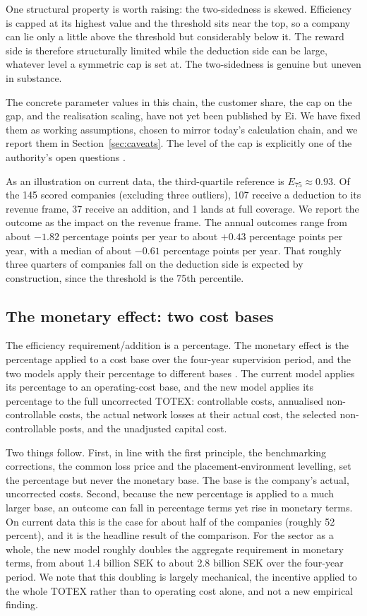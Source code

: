 One structural property is worth raising: the two-sidedness is skewed. Efficiency is capped at its
highest value and the threshold sits near the top, so a company can lie only a little above the
threshold but considerably below it. The reward side is therefore structurally limited while the
deduction side can be large, whatever level a symmetric cap is set at. The two-sidedness is genuine
but uneven in substance.

The concrete parameter values in this chain, the customer share, the cap on the gap, and the
realisation scaling, have not yet been published by Ei. We have fixed them as working assumptions,
chosen to mirror today's calculation chain, and we report them in Section~\ref{sec:caveats}. The
level of the cap is explicitly one of the authority's open questions
\citep[][]{Ei2026Effektivisering}.

As an illustration on current data, the third-quartile reference is $E_{75} \approx 0.93$. Of
the 145 scored companies (excluding three outliers), 107 receive a deduction to its revenue frame, 37 receive an addition, and 1 lands at full
coverage. We report the outcome as the impact on the revenue frame.  The
annual outcomes range from about $-1.82$ percentage points per year to about $+0.43$ percentage points per year, with
a median of about $-0.61$ percentage points per year. That roughly three quarters of companies fall
on the deduction side is expected by construction, since the threshold is the 75th percentile.

\subsection{The monetary effect: two cost bases}

The efficiency requirement/addition is a percentage. The monetary effect is the percentage applied to a
cost base over the four-year supervision period, and the two models apply their percentage to
different bases \citep[][]{Ei2025Tillampning}. The current model applies its percentage to an operating-cost base, and the new model applies its
percentage to the full uncorrected TOTEX: controllable costs, annualised non-controllable costs,
the actual network losses at their actual cost, the selected non-controllable posts, and the
unadjusted capital cost.

Two things follow. First, in line with the first principle, the benchmarking corrections, the
common loss price and the placement-environment levelling, set the percentage but never the monetary
base. The base is the company's actual, uncorrected costs. Second, because the new percentage is
applied to a much larger base, an outcome can fall in percentage terms yet rise in monetary terms. On
current data this is the case for about half of the companies (roughly 52 percent), and it is the
headline result of the comparison. For the sector as a whole, the new model roughly doubles the
aggregate requirement in monetary terms, from about 1.4 billion SEK to about 2.8 billion SEK over the
four-year period. We note that this doubling is largely mechanical, the incentive applied to the
whole TOTEX rather than to operating cost alone, and not a new empirical finding.

